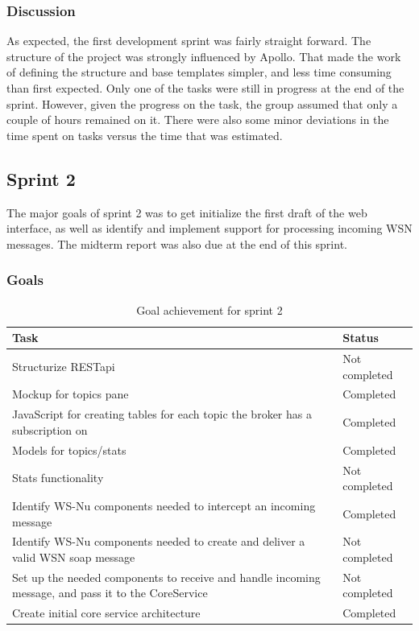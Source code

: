 \subsubsection{Discussion}
\label{subsec:project_lifecycle-development-sprint_1-discussion}

As expected, the first development sprint was fairly straight forward. The structure of the project was strongly influenced by Apollo. That made the work of defining the structure and base templates simpler, and less time consuming than first expected. Only one of the tasks were still in progress at the end of the sprint. However, given the progress on the task, the group assumed that only a couple of hours remained on it. There were also some minor deviations in the time spent on tasks versus the time that was estimated.

\subsection{Sprint 2}
\label{subsec:project_lifecycle-development-sprint_2}

The major goals of sprint 2 was to get initialize the first draft of the web interface, as well as identify and implement support for processing incoming WSN messages. The midterm report was also due at the end of this sprint.

\subsubsection{Goals}
\label{subsec:project_lifecycle-development-sprint_2-goals}

\begin{table}[ht!]
\small
\centering
\begin{tabular}{ | p{10cm} | p{2cm} |}
\hline
\rowcolor{lightgray}
 \textbf{Task} & \textbf{Status} \\
\hline
\rowcolor{orange!40}
Structurize RESTapi & Not completed \\
\rowcolor{green!30}
Mockup for topics pane & Completed \\
\rowcolor{green!30}
JavaScript for creating tables for each topic the broker has a subscription on & Completed \\
\rowcolor{green!30}
Models for topics/stats & Completed \\
\rowcolor{orange!40}
Stats functionality	& Not completed \\
\rowcolor{green!30}
Identify WS-Nu components needed to intercept an incoming message & Completed \\
\rowcolor{orange!40}
Identify WS-Nu components needed to create and deliver a valid WSN soap message & Not completed \\
\rowcolor{orange!40}
Set up the needed components to receive and handle incoming message, and pass it to the CoreService	& Not completed \\
\rowcolor{green!30}
Create initial core service architecture & Completed \\
\hline
\end{tabular}
\caption{Goal achievement for sprint 2}
\label{tab:sprint 2, goals}
\end{table}


